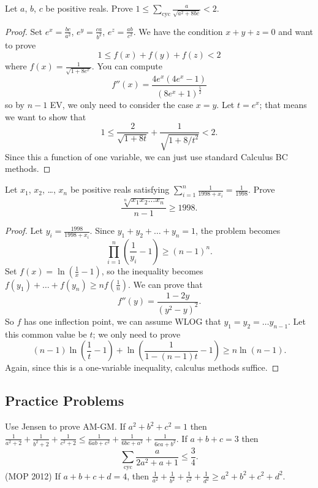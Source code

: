 \documentclass[11pt]{scrartcl}
\begin{document}
\begin{example}
   Let $a$, $b$, $c$ be positive reals.
  Prove
  $ 1 \le \sum_{\text{cyc}} \frac{a}{\sqrt{a^2+8bc}} < 2 $.
\end{example}
\begin{proof}
  Set $e^x = \frac{bc}{a^2}$, $e^y = \frac{ca}{b^2}$, $e^z = \frac{ab}{c^2}$. We have the condition $x+y+z=0$ and want to prove
  \[ 1 \le f(x) + f(y) + f(z) < 2 \]
  where $f(x) = \frac{1}{\sqrt{1+8e^x}}$. You can compute
  \[ f''(x) = \frac{4e^x \left( 4e^x-1 \right)}{(8e^x+1)^{\frac52}} \]
  so by $n-1$ EV, we only need to consider the case $x=y$.
  Let $t=e^x$; that means we want to show that
  \[ 1 \le \frac{2}{\sqrt{1+8t}} + \frac{1}{\sqrt{1+8/t^2}} < 2. \]
  Since this a function of one variable, we can just use standard Calculus BC methods.
\end{proof}

\begin{example}
  [Vietnam 1998] Let $x_1$, $x_2$, \dots, $x_n$ be positive reals satisfying $\sum_{i=1}^n \frac{1}{1998+x_i} = \frac{1}{1998}$. Prove
  \[ \frac{\sqrt[n]{x_1x_2 \dots x_n}}{n-1} \ge 1998. \]
\end{example}
\begin{proof}
  Let $y_i = \frac{1998}{1998+x_i}$. Since $y_1 + y_2 + \dots + y_n = 1$, the problem becomes
  \[ \prod_{i=1}^n \left( \frac{1}{y_i} - 1 \right) \ge \left( n-1 \right)^n. \]
  Set $f(x) = \ln \left( \frac 1x-1 \right)$, so the inequality becomes $f(y_1) + \dots + f(y_n) \ge n f\left( \frac 1n \right)$.
  We can prove that
  \[ f''(y) = \frac{1-2y}{(y^2-y)^2}. \]
  So $f$ has one inflection point, we can assume WLOG that $y_1 = y_2 = \dots y_{n-1}$. Let this common value be $t$; we only need to prove
  \[ (n-1) \ln \left( \frac{1}{t}-1 \right) + \ln \left( \frac{1}{1-(n-1)t}-1 \right) \ge n \ln (n-1). \]
  Again, since this is a one-variable inequality,
  calculus methods suffice.
\end{proof}

\subsection{Practice Problems}
\begin{enumerate}
  \ii Use Jensen to prove AM-GM.
  \ii If $a^2+b^2+c^2=1$ then $\frac{1}{a^2+2}+\frac{1}{b^2+2}+\frac{1}{c^2+2}\le\frac{1}{6ab+c^2}+\frac{1}{6bc+a^2}+\frac{1}{6ca+b^2}$.
  \ii If $a+b+c=3$ then \[ \sum_{\text{cyc}} \frac{a}{2a^2+a+1} \le \frac 34. \]
  \ii (MOP 2012) If $a+b+c+d = 4$, then $\frac{1}{a^2}+\frac{1}{b^2}+\frac{1}{c^2}+\frac{1}{d^2}\ge a^2+b^2+c^2+d^2$.
\end{enumerate}
\end{document}
